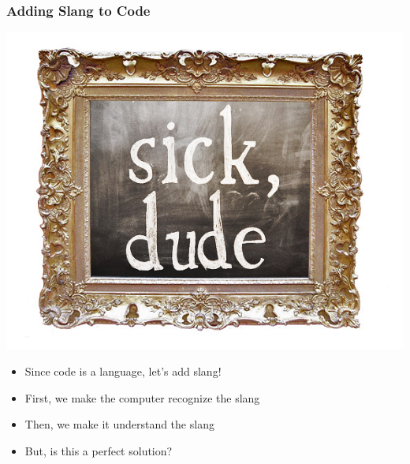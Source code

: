 \documentclass[bigger]{beamer}
\begin{document}
\begin{frame}
\frametitle{Adding Slang to Code}
\label{sec-6}


\includegraphics[scale=0.25]{../pictures/slang.jpg}


\begin{itemize}
\item Since code is a language, let's add slang!
\item First, we make the computer recognize the slang
\item Then, we make it understand the slang
\end{itemize}
\pause

\begin{itemize}
\item But, is this a perfect solution?
\end{itemize}
\end{frame}
\end{document}
